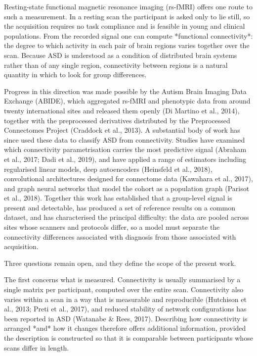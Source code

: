 \documentclass[a4paper,fleqn]{cas-sc}
\begin{document}
Resting-state functional magnetic resonance imaging (rs-fMRI) offers one route to such a measurement. In a resting scan the participant is asked only to lie still, so the acquisition requires no task compliance and is feasible in young and clinical populations. From the recorded signal one can compute *functional connectivity*: the degree to which activity in each pair of brain regions varies together over the scan. Because ASD is understood as a condition of distributed brain systems rather than of any single region, connectivity between regions is a natural quantity in which to look for group differences.

Progress in this direction was made possible by the Autism Brain Imaging Data Exchange (ABIDE), which aggregated rs-fMRI and phenotypic data from around twenty international sites and released them openly (Di Martino et al., 2014), together with the preprocessed derivatives distributed by the Preprocessed Connectomes Project (Craddock et al., 2013). A substantial body of work has since used these data to classify ASD from connectivity. Studies have examined which connectivity parametrisation carries the most predictive signal (Abraham et al., 2017; Dadi et al., 2019), and have applied a range of estimators including regularised linear models, deep autoencoders (Heinsfeld et al., 2018), convolutional architectures designed for connectome data (Kawahara et al., 2017), and graph neural networks that model the cohort as a population graph (Parisot et al., 2018). Together this work has established that a group-level signal is present and detectable, has produced a set of reference results on a common dataset, and has characterised the principal difficulty: the data are pooled across sites whose scanners and protocols differ, so a model must separate the connectivity differences associated with diagnosis from those associated with acquisition.

Three questions remain open, and they define the scope of the present work.

The first concerns what is measured. Connectivity is usually summarised by a single matrix per participant, computed over the entire scan. Connectivity also varies within a scan in a way that is measurable and reproducible (Hutchison et al., 2013; Preti et al., 2017), and reduced stability of network configurations has been reported in ASD (Watanabe & Rees, 2017). Describing how connectivity is arranged *and* how it changes therefore offers additional information, provided the description is constructed so that it is comparable between participants whose scans differ in length.
\end{document}
